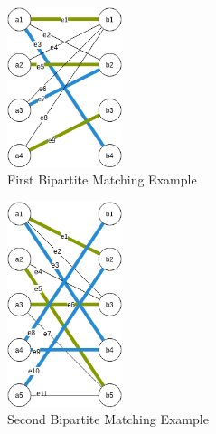 \documentclass[12pt, letter]{article}
\begin{document}
\begin{figure}[h]
	\centering
	\includegraphics[width=0.3\textwidth]{figa}
	\caption{First Bipartite Matching Example}
	\label{fig:figa}
\end{figure}

\begin{figure}[h]
	\centering
	\includegraphics[width=0.3\textwidth]{figb}
	\caption{Second Bipartite Matching Example}
	\label{fig:figb}
\end{figure}
\end{document}
